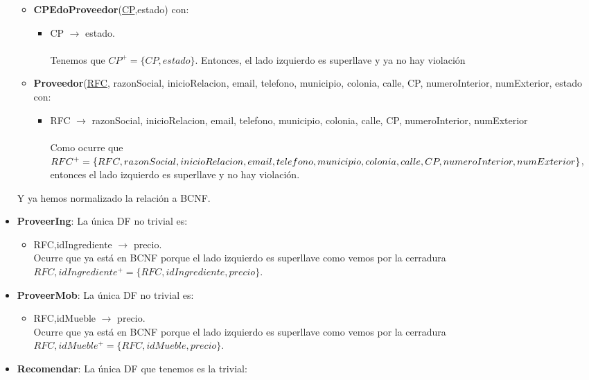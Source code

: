 \documentclass[11pt,letterpaper]{article}
\begin{document}
\begin{itemize}
\begin{itemize}
\item {\footnotesize \textbf{CPEdoProveedor}(\underline{CP},estado)} con:
\begin{itemize}
\item CP $\rightarrow$ estado.\\\\ Tenemos que $CP^+ = \{CP,estado\}$. Entonces, el lado izquierdo es superllave y ya no hay violación \checkmark
\end{itemize}
\item {\footnotesize \textbf{Proveedor}(\underline{RFC}, razonSocial, inicioRelacion, email, telefono,  municipio, colonia, calle, CP, numeroInterior, numExterior, estado} con:
\begin{itemize}
\item RFC $\rightarrow$  razonSocial, inicioRelacion, email, telefono,  municipio, colonia, calle, CP, numeroInterior, numExterior\\\\Como ocurre que $RFC^+=\{RFC,razonSocial, inicioRelacion, email,\\telefono,  municipio, colonia, calle,\\ CP, numeroInterior, numExterior\}$, entonces el lado izquierdo es superllave y no hay violación. \checkmark
\end{itemize}
\end{itemize}

Y ya hemos normalizado la relación a BCNF.

\item \textbf{ProveerIng}: La única DF no trivial es:

\begin{itemize}
\item RFC,idIngrediente $\rightarrow$ precio.\\Ocurre que ya está en BCNF porque el lado izquierdo es superllave como vemos por la cerradura $RFC,idIngrediente^+=\{RFC,idIngrediente,precio\}$. \checkmark
\end{itemize}
\item \textbf{ProveerMob}: La única DF no trivial es:

\begin{itemize}
\item RFC,idMueble $\rightarrow$ precio.\\Ocurre que ya está en BCNF porque el lado izquierdo es superllave como vemos por la cerradura $RFC,idMueble^+=\{RFC,idMueble,precio\}$. \checkmark
\end{itemize}
\item \textbf{Recomendar}: La única DF que tenemos es la trivial:


\end{itemize}
\end{document}

